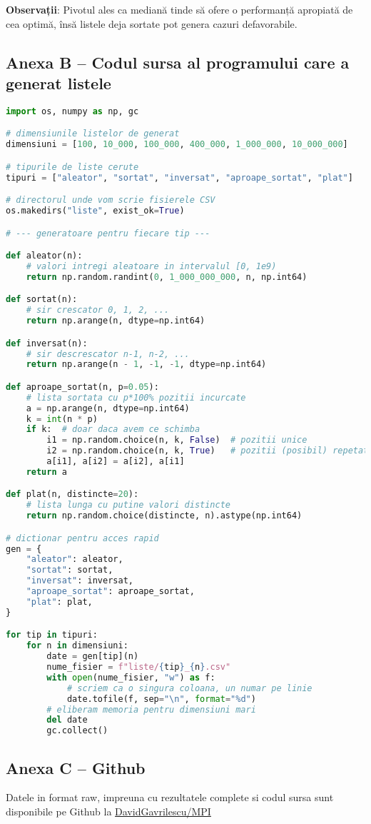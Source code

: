 \documentclass{article}
\begin{document}
\textbf{Observații}: Pivotul ales ca mediană tinde să ofere o performanță apropiată de cea optimă, însă listele deja sortate pot genera cazuri defavorabile.

\clearpage

\subsection*{Anexa B – Codul sursa al programului care a generat listele}
\begin{lstlisting}[language=Python, caption={Generatorul de liste}, label={lst:gen}]
import os, numpy as np, gc

# dimensiunile listelor de generat
dimensiuni = [100, 10_000, 100_000, 400_000, 1_000_000, 10_000_000]

# tipurile de liste cerute
tipuri = ["aleator", "sortat", "inversat", "aproape_sortat", "plat"]

# directorul unde vom scrie fisierele CSV
os.makedirs("liste", exist_ok=True)

# --- generatoare pentru fiecare tip ---

def aleator(n):
    # valori intregi aleatoare in intervalul [0, 1e9)
    return np.random.randint(0, 1_000_000_000, n, np.int64)

def sortat(n):
    # sir crescator 0, 1, 2, ...
    return np.arange(n, dtype=np.int64)

def inversat(n):
    # sir descrescator n-1, n-2, ...
    return np.arange(n - 1, -1, -1, dtype=np.int64)

def aproape_sortat(n, p=0.05):
    # lista sortata cu p*100% pozitii incurcate
    a = np.arange(n, dtype=np.int64)
    k = int(n * p)
    if k:  # doar daca avem ce schimba
        i1 = np.random.choice(n, k, False)  # pozitii unice
        i2 = np.random.choice(n, k, True)   # pozitii (posibil) repetate
        a[i1], a[i2] = a[i2], a[i1]
    return a

def plat(n, distincte=20):
    # lista lunga cu putine valori distincte
    return np.random.choice(distincte, n).astype(np.int64)

# dictionar pentru acces rapid
gen = {
    "aleator": aleator,
    "sortat": sortat,
    "inversat": inversat,
    "aproape_sortat": aproape_sortat,
    "plat": plat,
}

for tip in tipuri:
    for n in dimensiuni:
        date = gen[tip](n)
        nume_fisier = f"liste/{tip}_{n}.csv"
        with open(nume_fisier, "w") as f:
            # scriem ca o singura coloana, un numar pe linie
            date.tofile(f, sep="\n", format="%d")
        # eliberam memoria pentru dimensiuni mari
        del date
        gc.collect()
\end{lstlisting}

\subsection*{Anexa C – Github}
Datele in format raw, impreuna cu rezultatele complete si codul sursa sunt disponibile pe Github la 
\href{https://github.com/DavidGavrilescu/MPI}{DavidGavrilescu/MPI}

\end{document}
